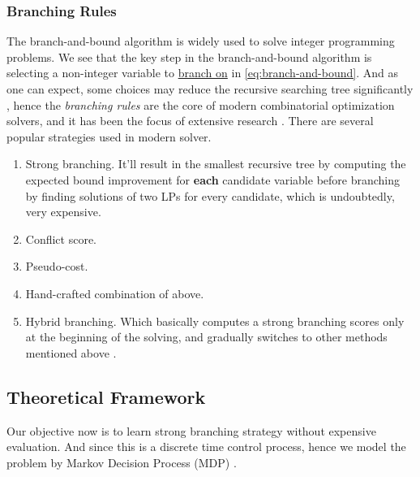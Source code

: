 \documentclass{article}
\begin{document}
\subsubsection{Branching Rules}
The branch-and-bound algorithm is widely used to solve integer programming problems. We see that the key step in the branch-and-bound algorithm is selecting a non-integer
variable to \underline{branch on} in \autoref{eq:branch-and-bound}. And as one can expect, some choices may reduce the recursive searching tree
significantly \cite{B&B.branching-impact}, hence the \emph{branching rules} are the core of modern combinatorial optimization solvers, and it has been the focus of extensive
research \cite{B&B-branching-rules-research-1, B&B-branching-rules-research-2, B&B-branching-rules-research-3, B&B-branching-rules-research-4}. There are several popular
strategies \cite{branching-rules-revisited} used in modern solver.
\begin{enumerate}
	\item Strong branching. It'll result in the smallest recursive tree by computing the expected bound improvement for \textbf{each} candidate variable before branching by
	      finding solutions of two LPs for every candidate, which is undoubtedly, very expensive. \cite{Finding-cuts-in-the-TSP}
	\item Conflict score.
	\item Pseudo-cost. \cite{B&B-branching-rules-research-2}
	\item Hand-crafted combination of above.
	\item Hybrid branching. Which basically computes a strong branching scores only at the beginning of the solving, and gradually switches to other methods mentioned
	      above \cite{branching-rules-revisited, B&B-branching-rules-research-4}.
\end{enumerate}

\subsection{Theoretical Framework}
Our objective now is to learn strong branching strategy without expensive evaluation. And since this is a discrete time control process, hence we model the problem by Markov Decision Process (MDP) \cite{howard1960dynamic}.
\end{document}
